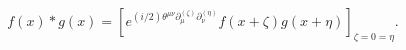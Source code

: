 \begin{equation}
f(x) \ast g(x) = \left[e^{(i/2) \theta^{\mu \nu}
\partial^{(\zeta)}_{\mu} \partial^{(\eta)}_{\nu}} f(x + \zeta) g(x +
\eta) \right]_{\zeta=0=\eta}.
\end{equation}

